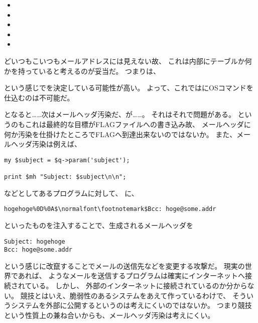 \begin{itemize}
	\item {}
	\item {}
	\item {}
	\item {}
	\item {}
\end{itemize}

どいつもこいつもメールアドレスには見えない故、
これは内部にテーブルか何かを持っていると考えるのが妥当だ。
つまりは、

\columnbreak



という感じでを決定している可能性が高い。
よって、これではにOSコマンドを仕込むのは不可能だ。

となると……次はメールヘッダ汚染だ、が……。
それはそれで問題がある。
というのもこれは最終的な目標がFLAGファイルへの書き込み故、
メールヘッダに何か汚染を仕掛けたところでFLAGへ到達出来ないのではないか。
また、メールヘッダ汚染は例えば、

\begin{lstlisting}[style=perl]
my $subject = $q->param('subject');

print $mh "Subject: $subject\n\n";
\end{lstlisting}

などとしてあるプログラムに対して、
に、

\begin{lstlisting}[mathescape]
hogehoge%0D%0A$\normalfont\footnotemark$Bcc: hoge@some.addr
\end{lstlisting}

といったものを注入することで、生成されるメールヘッダを

\begin{lstlisting}
Subject: hogehoge
Bcc: hoge@some.addr
\end{lstlisting}

という感じに改竄することでメールの送信先などを変更する攻撃だ。
現実の世界であれば、
ようなメールを送信するプログラムは確実にインターネットへ接続されている。
しかし、
外部のインターネットに接続されているのか分からない。
競技とはいえ、脆弱性のあるシステムをあえて作っているわけで、
そういうシステムを外部に公開するというのは考えにくいのではないか。
つまり競技という性質上の兼ね合いからも、メールヘッダ汚染は考えにくい。

